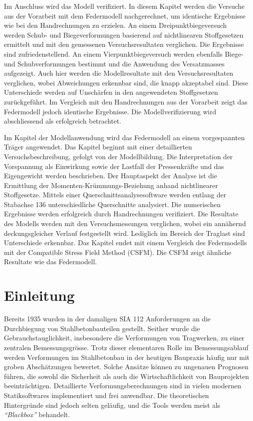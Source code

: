 \documentclass[
  11pt,
  letterpaper,
]{scrreprt}
\renewcommand*\contentsname{Inhaltsverzeichnis}
\newcommand\contentsname{Inhaltsverzeichnis}
\begin{document}
Im Anschluss wird das Modell verifiziert. In diesem Kapitel werden die Versuche aus der Vorarbeit mit dem Federmodell nachgerechnet, um identische Ergebnisse wie bei den Handrechnungen zu erzielen. An einem Dreipunktbiegeversuch werden Schub- und Biegeverformungen basierend auf nichtlinearen Stoffgesetzen ermittelt und mit den gemessenen Versuchsresultaten verglichen. Die Ergebnisse sind zufriedenstellend. An einem Vierpunktbiegeversuch werden ebenfalls Biege- und Schubverformungen bestimmt und die Anwendung des Versatzmasses aufgezeigt. Auch hier werden die Modellresultate mit den Versuchsresultaten verglichen, wobei Abweichungen erkennbar sind, die knapp akzeptabel sind. Diese Unterschiede werden auf Unschärfen in den angewendeten Stoffgesetzen zurückgeführt. Im Vergleich mit den Handrechnungen aus der Vorarbeit zeigt das Federmodell jedoch identische Ergebnisse. Die Modellverifizierung wird abschliessend als erfolgreich betrachtet.

Im Kapitel der Modellanwendung wird das Federmodell an einem vorgespannten Träger angewendet. Das Kapitel beginnt mit einer detaillierten Versuchsbeschreibung, gefolgt von der Modellbildung. Die Interpretation der Vorspannung als Einwirkung sowie der Lastfall der Pressenkräfte und das Eigengewicht werden beschrieben. Der Hauptaspekt der Analyse ist die Ermittlung der Momenten-Krümmungs-Beziehung anhand nichtlinearer Stoffgesetze. Mittels einer Querschnittsanalysesoftware werden entlang der Stabachse 136 unterschiedliche Querschnitte analysiert. Die numerischen Ergebnisse werden erfolgreich durch Handrechnungen verifiziert. Die Resultate des Modells werden mit den Versuchsmessungen verglichen, wobei ein annähernd deckungsgleicher Verlauf festgestellt wird. Lediglich im Bereich der Traglast sind Unterschiede erkennbar. Das Kapitel endet mit einem Vergleich des Federmodells mit der Compatible Stress Field Method (CSFM). Die CSFM zeigt ähnliche Resultate wie das Federmodell.

\renewcommand*\contentsname{Inhaltsverzeichnis}
{
\hypersetup{linkcolor=}
\setcounter{tocdepth}{1}
\tableofcontents
}
\listoffigures
{}

\chapter{Einleitung}\label{einleitung}

Bereits 1935 wurden in der damaligen SIA 112 Anforderungen an die
Durchbiegung von Stahlbetonbauteilen gestellt. Seither wurde die
Gebrauchstauglichkeit, insbesondere die Verformungen von Tragwerken, zu
einer zentralen Bemessungsgrösse. Trotz dieser elementaren Rolle im
Bemessungsablauf werden Verformungen im Stahlbetonbau in der heutigen
Baupraxis häufig nur mit groben Abschätzungen bewertet. Solche Ansätze
können zu ungenauen Prognosen führen, die sowohl die Sicherheit als auch
die Wirtschaftlichkeit von Bauprojekten beeinträchtigen. Detaillierte
Verformungsberechnungen sind in vielen modernen Statiksoftwares
implementiert und frei anwendbar. Die theoretischen Hintergründe sind
jedoch selten geläufig, und die Tools werden meist als
\emph{``Blackbox''} behandelt.
\end{document}
